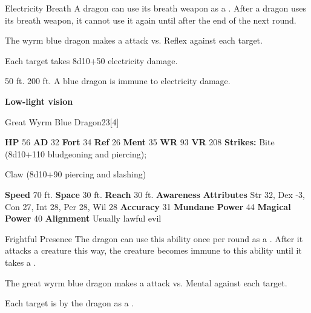     \begin{freeability}{Electricity Breath}
      A dragon can use its breath weapon as a .
      After a dragon uses its breath weapon, it cannot use it again until after the end of the next round.
      \par The wyrm blue dragon makes a  attack
        vs. Reflex against each target.
    
    \hit Each target takes 8d10+50 electricity damage.
    \end{freeability}
  
      
       50 ft.
     200 ft.
     A blue dragon is immune to electricity damage.
    \par\noindent\textbf{Low-light vision}
  

  \begin{monsubsection}{Great Wyrm Blue Dragon}{23}[4]
    \vspace{-1em}\vspace{-1em}
    \vspace{0em}

    
    

    \begin{spellcontent}
      \begin{spelltargetinginfo}
        \pari \textbf{HP} 56 \monsep
          \textbf{AD} 32 \monsep
          \textbf{Fort} 34 \monsep
          \textbf{Ref} 26 \monsep
          \textbf{Ment} 35
        \pari \textbf{WR} 93 \monsep
        \textbf{VR} 208
        \pari \textbf{Strikes:}
            Bite  (8d10+110 bludgeoning and piercing);
\par Claw  (8d10+90 piercing and slashing)
      \end{spelltargetinginfo}
    \end{spellcontent}
    \begin{monsterfooter}
      \pari \textbf{Speed} 70 ft. \monsep
        \textbf{Space} 30 ft. \monsep
        \textbf{Reach} 30 ft.
      \pari \textbf{Awareness} 
      \pari \textbf{Attributes}
        Str 32, Dex -3,
        Con 27, Int 28,
        Per 28, Wil 28
      \pari \textbf{Accuracy} 31 \monsep
        \textbf{Mundane Power} 44 \monsep
      \textbf{Magical Power} 40
      \pari \textbf{Alignment} Usually lawful evil
    \end{monsterfooter}
  \end{monsubsection}
  \begin{freeability}{Frightful Presence}
      The dragon can use this ability once per round as a .
      After it attacks a creature this way, the creature becomes immune to this ability until it takes a .
      \par The great wyrm blue dragon makes a  attack
        vs. Mental against each target.
    
    \hit Each target is  by the dragon as a .
    \end{freeability}
  

